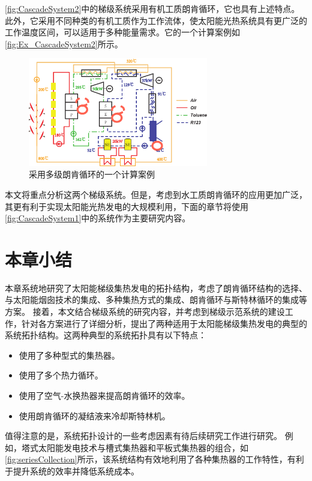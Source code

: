 \autoref{fig:CascadeSystem2}中的梯级系统采用有机工质朗肯循环，它也具有上述特点。此外，它采用不同种类的有机工质作为工作流体，使太阳能光热系统具有更广泛的工作温度区间，可以适用于多种能量需求。它的一个计算案例如\autoref{fig:Ex_CascadeSystem2}所示。
\begin{figure}[htbp]
\centering 
\includegraphics[width=0.7\textwidth]{fig/Ex_CascadeSystem2}
\caption{采用多级朗肯循环的一个计算案例}
\label{fig:Ex_CascadeSystem2}
\end{figure}

本文将重点分析这两个梯级系统。但是，考虑到水工质朗肯循环的应用更加广泛，其更有利于实现太阳能光热发电的大规模利用，下面的章节将使用\autoref{fig:CascadeSystem1}中的系统作为主要研究内容。

\newpage
\section{本章小结}
本章系统地研究了太阳能梯级集热发电的拓扑结构，考虑了朗肯循环结构的选择、与太阳能烟囱技术的集成、多种集热方式的集成、朗肯循环与斯特林循环的集成等方案。
接着，本文结合梯级系统的研究内容，并考虑到梯级示范系统的建设工作，针对各方案进行了详细分析，提出了两种适用于太阳能梯级集热发电的典型的系统拓扑结构。这两种典型的系统拓扑具有以下特点：

\begin{itemize}
  \item 使用了多种型式的集热器。
  \item 使用了多个热力循环。
  \item 使用了空气-水换热器来提高朗肯循环的效率。
  \item 使用朗肯循环的凝结液来冷却斯特林机。
\end{itemize}

值得注意的是，系统拓扑设计的一些考虑因素有待后续研究工作进行研究。 例如，塔式太阳能发电技术与槽式集热器和平板式集热器的组合，如\autoref{fig:seriesCollection}所示，该系统结构有效地利用了各种集热器的工作特性，有利于提升系统的效率并降低系统成本。